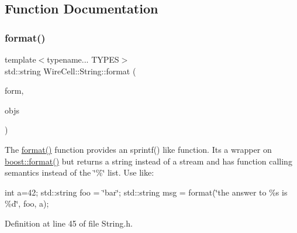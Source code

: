 \subsection{Function Documentation}
\mbox{\label{namespace_wire_cell_1_1_string_ade706f4cfc3f6e8a946d95f1b06dbb56}} 
\subsubsection{\texorpdfstring{format()}{format()}}
{\footnotesize\ttfamily template$<$typename... T\+Y\+P\+ES$>$ \\
std\+::string Wire\+Cell\+::\+String\+::format (\begin{DoxyParamCaption}\item[{const std\+::string \&}]{form,  }\item[{T\+Y\+P\+E\+S...}]{objs }\end{DoxyParamCaption})}

The \hyperlink{namespace_wire_cell_1_1_string_ade706f4cfc3f6e8a946d95f1b06dbb56}{format()} function provides an sprintf() like function. It\textquotesingle{}s a wrapper on \hyperlink{namespace_wire_cell_1_1_string_ade706f4cfc3f6e8a946d95f1b06dbb56}{boost\+::format()} but returns a string instead of a stream and has function calling semantics instead of the \char`\"{}\%\char`\"{} list. Use like\+:

int a=42; std\+::string foo = \char`\"{}bar\char`\"{}; std\+::string msg = format(\char`\"{}the answer to \%s is \%d\char`\"{}, foo, a); 

Definition at line 45 of file String.\+h.

